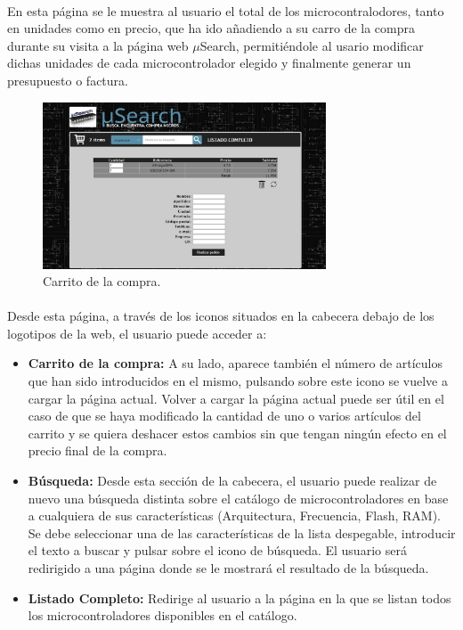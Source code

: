 \paragraph{}En esta página se le muestra al usuario el total de los microcontralodores, tanto en unidades como en precio, que ha ido añadiendo a su carro de la compra durante su visita a la página web $\mu$Search, permitiéndole al usario modificar dichas unidades de cada microcontrolador elegido y finalmente generar un presupuesto o factura.

\begin{figure}[h!]
	\centering
	\includegraphics[width=0.75\textwidth]{img/carrito}
	\caption{Carrito de la compra.}
	\label{fig:carrito}
\end{figure}

\paragraph{}Desde esta página, a través de los iconos situados en la cabecera debajo de los logotipos de la web, el usuario puede acceder a:

\begin{itemize}
	\item \textbf{Carrito de la compra:} A su lado, aparece también el número de artículos que han sido introducidos en el mismo, pulsando sobre este icono se vuelve a cargar la página actual. Volver a cargar la página actual puede ser útil en el caso de que se haya modificado la cantidad de uno o varios artículos del carrito y se quiera deshacer estos cambios sin que tengan ningún efecto en el precio final de la compra.

	\item \textbf{Búsqueda:} Desde esta sección de la cabecera, el usuario puede realizar de nuevo una búsqueda distinta sobre el catálogo de microcontroladores en base a cualquiera de sus características (Arquitectura, Frecuencia, Flash, RAM). Se debe seleccionar una de las características de la lista despegable, introducir el texto a buscar y pulsar sobre el icono de búsqueda.
	El usuario será redirigido a una página donde se le mostrará el resultado de la búsqueda.

	\item \textbf{Listado Completo:} Redirige al usuario a la página en la que se listan todos los microcontroladores disponibles en el catálogo.
\end{itemize}

